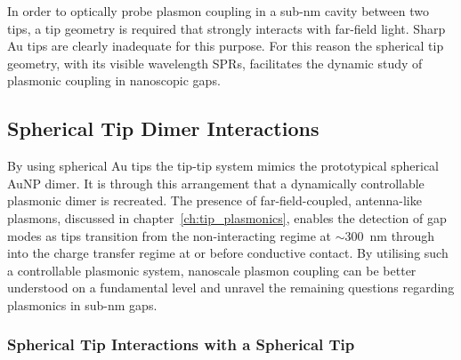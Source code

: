 \documentclass[a4paper]{article}
\begin{document}
In order to optically probe plasmon coupling in a sub-nm cavity between two tips, a tip geometry is required that strongly interacts with far-field light. Sharp Au tips are clearly inadequate for this purpose. For this reason the spherical tip geometry, with its visible wavelength SPRs, facilitates the dynamic study of plasmonic coupling in nanoscopic gaps.

\subsection{Spherical Tip Dimer Interactions}

By using spherical Au tips the tip-tip system mimics the prototypical spherical AuNP dimer. It is through this  arrangement that a dynamically controllable plasmonic dimer is recreated. The presence of far-field-coupled, antenna-like plasmons, discussed in chapter~\ref{ch:tip_plasmonics}, enables the detection of gap modes as tips transition from the non-interacting regime at $\sim$\SI{300}{nm} through into the charge transfer regime at or before conductive contact. By utilising such a controllable plasmonic system, nanoscale plasmon coupling can be better understood on a fundamental level and unravel the remaining questions regarding plasmonics in sub-nm gaps.

\subsubsection{Spherical Tip Interactions with a Spherical Tip}
\end{document}

